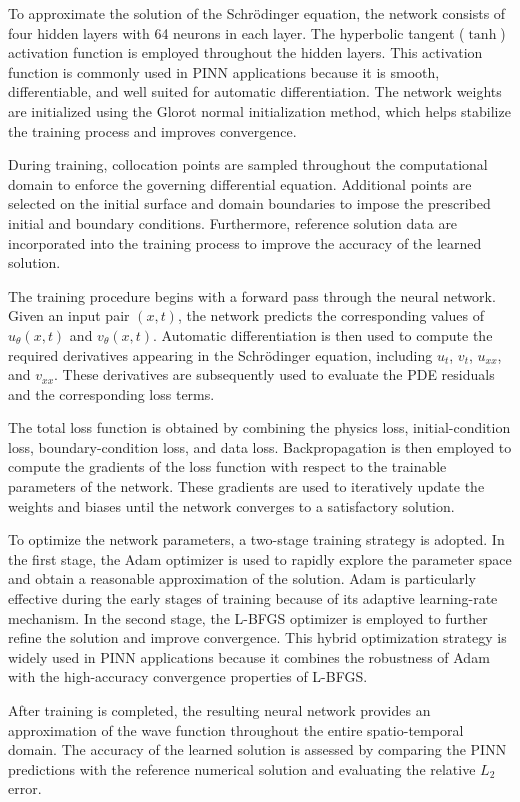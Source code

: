 \documentclass[11pt]{article}
\begin{document}
To approximate the solution of the Schrödinger equation, the network consists of four hidden layers with 64 neurons in each layer. The hyperbolic tangent ($\tanh$) activation function is employed throughout the hidden layers. This activation function is commonly used in PINN applications because it is smooth, differentiable, and well suited for automatic differentiation. The network weights are initialized using the Glorot normal initialization method, which helps stabilize the training process and improves convergence.

During training, collocation points are sampled throughout the computational domain to enforce the governing differential equation. Additional points are selected on the initial surface and domain boundaries to impose the prescribed initial and boundary conditions. Furthermore, reference solution data are incorporated into the training process to improve the accuracy of the learned solution.

The training procedure begins with a forward pass through the neural network. Given an input pair $(x,t)$, the network predicts the corresponding values of $u_\theta(x,t)$ and $v_\theta(x,t)$. Automatic differentiation is then used to compute the required derivatives appearing in the Schrödinger equation, including $u_t$, $v_t$, $u_{xx}$, and $v_{xx}$. These derivatives are subsequently used to evaluate the PDE residuals and the corresponding loss terms.

The total loss function is obtained by combining the physics loss, initial-condition loss, boundary-condition loss, and data loss. Backpropagation is then employed to compute the gradients of the loss function with respect to the trainable parameters of the network. These gradients are used to iteratively update the weights and biases until the network converges to a satisfactory solution.

To optimize the network parameters, a two-stage training strategy is adopted. In the first stage, the Adam optimizer is used to rapidly explore the parameter space and obtain a reasonable approximation of the solution. Adam is particularly effective during the early stages of training because of its adaptive learning-rate mechanism. In the second stage, the L-BFGS optimizer is employed to further refine the solution and improve convergence. This hybrid optimization strategy is widely used in PINN applications because it combines the robustness of Adam with the high-accuracy convergence properties of L-BFGS.

After training is completed, the resulting neural network provides an approximation of the wave function throughout the entire spatio-temporal domain. The accuracy of the learned solution is assessed by comparing the PINN predictions with the reference numerical solution and evaluating the relative $L_2$ error.
\end{document}
